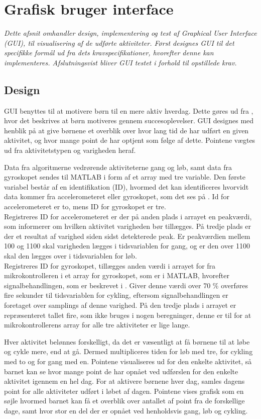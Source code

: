 \section{Grafisk bruger interface}\label{GUI_design}
\textit{Dette afsnit omhandler design, implementering og test af Graphical User Interface (GUI), til visualisering af de udførte aktiviteter. Først designes GUI til det specifikke formål ud fra dets kravspecifikationer, hvorefter denne kan implementeres. Afslutningsvist bliver GUI testet i forhold til opstillede krav.}
\subsection{Design}
GUI benyttes til at motivere børn til en mere aktiv hverdag. Dette gøres ud fra , hvor det beskrives at børn motiveres gennem succesoplevelser. GUI designes med henblik på at give børnene et overblik over hvor lang tid de har udført en given aktivitet, og hvor mange point de har optjent som følge af dette. Pointene vægtes ud fra aktivitetstypen og varigheden heraf. 

Data fra algoritmerne vedrørende aktiviteterne gang og løb, samt data fra gyroskopet sendes til MATLAB i form af et array med tre variable. Den første variabel består af en identifikation (ID), hvormed det kan identificeres hvorvidt data kommer fra accelerometeret eller gyroskopet, som det ses på . Id for accelerometeret er to, mens ID for gyroskopet er tre.\\
Registreres ID for accelerometeret er der på anden plads i arrayet en peakværdi, som informerer om hvilken aktivitet varigheden bør tillægges. På tredje plads er der et resultat af varighed siden sidst detekterede peak. Er peakværdien mellem 100 og 1100 skal varigheden lægges i tidsvariablen for gang, og er den over 1100 skal den lægges over i tidsvariablen for løb.\\
Registreres ID for gyroskopet, tillægges anden værdi i arrayet for fra mikrokontrolleren i et array for gyroskopet, som er i MATLAB, hvorefter signalbehandlingen, som er beskrevet i . Giver denne værdi over 70 \% overføres fire sekunder til tidsvariablen for cykling, eftersom signalbehandlingen er foretaget over samplings af denne varighed. På den tredje plads i arrayet er repræsenteret tallet fire, som ikke bruges i nogen beregninger, denne er til for at mikrokontrollerens array for alle tre aktiviteter er lige lange. 

Hver aktivitet belønnes forskelligt, da det er væsentligt at få børnene til at løbe og cykle mere, end at gå. Dermed multipliceres tiden for løb med tre, for cykling med to og for gang med en. Pointene visualiseres ud for den enkelte aktivitet, så barnet kan se hvor mange point de har opnået ved udførslen for den enkelte aktivitet igennem en hel dag. For at aktivere børnene hver dag, samles dagens point for alle aktiviteter udført i løbet af dagen. Pointene vises grafisk som en søjle hvormed barnet kan få et overblik over antallet af point fra de forskellige dage, samt hvor stor en del der er opnået ved henholdsvis gang, løb og cykling.  

